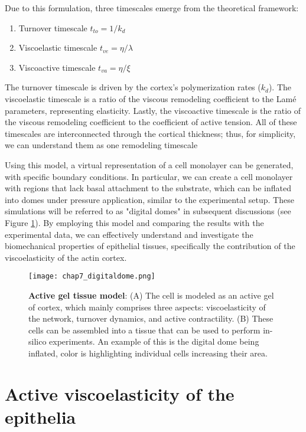 Due to this formulation, three timescales emerge from the theoretical framework: 

\begin{enumerate}
	\item Turnover timescale \(t_{to} = 1/k_{d}\)
	\item Viscoelastic timescale \(t_{ve} = \eta/\lambda\)
	\item Viscoactive timescale \(t_{va} = \eta/\xi\)
\end{enumerate}

The turnover timescale is driven by the cortex's polymerization rates (\(k_{d}\)). The viscoelastic timescale is a ratio of the viscous remodeling coefficient to the Lamé parameters, representing elasticity. Lastly, the viscoactive timescale is the ratio of the viscous remodeling coefficient to the coefficient of active tension. All of these timescales are interconnected through the cortical thickness; thus, for simplicity, we can understand them as one remodeling timescale

Using this model, a virtual representation of a cell monolayer can be generated, with specific boundary conditions. In particular, we can create a cell monolayer with regions that lack basal attachment to the substrate, which can be inflated into domes under pressure application, similar to the experimental setup. These simulations will be referred to as "digital domes" in subsequent discussions  (see Figure \ref{fig_7_2}). By employing this model and comparing the results with the experimental data, we can effectively understand and investigate the biomechanical properties of epithelial tissues, specifically the contribution of the viscoelasticity of the actin cortex.

\begin{figure}[]
	\centering
	\texttt{[image: chap7\_digitaldome.png]}
	\caption{\label{fig_7_2} \textbf{Active gel tissue model}: (A) The cell is modeled as an active gel of cortex, which mainly comprises three aspects: viscoelasticity of the network, turnover dynamics, and active contractility. (B) These cells can be assembled into a tissue that can be used to perform in-silico experiments. An example of this is the digital dome being inflated, color is highlighting individual cells increasing their area.}
\end{figure}

\hypertarget{active-viscoelasticity-of-the-epithelia}{%
	\section{Active viscoelasticity of the
		epithelia}\label{active-viscoelasticity-of-the-epithelia}}
	
